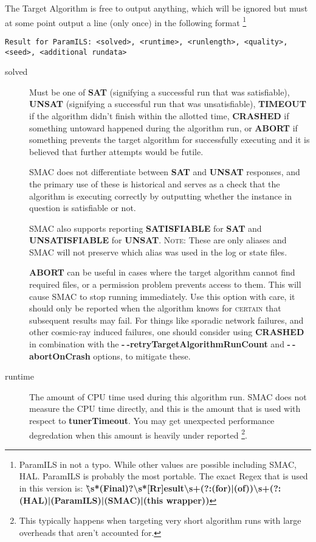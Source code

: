 \documentclass[manual.tex]{subfiles}
\begin{document}
The Target Algorithm is free to output anything, which will be ignored
but must at some point output a line (only once) in the following
format%
\footnote{ParamILS in not a typo. While other values are possible including
SMAC, HAL. ParamILS is probably the most portable. The exact Regex
that is used in this version is: \textbf{\^\textbackslash{}s{*}(Final)?\textbackslash{}s{*}{[}Rr{]}esult\textbackslash{}s+(?:(for)|(of))\textbackslash{}s+(?:(HAL)|(ParamILS)|(SMAC)|(this
wrapper))}} %


\texttt{Result for ParamILS: <solved>, <runtime>, <runlength>, <quality>, <seed>, <additional rundata>}
\begin{description}

\item [{solved}] Must be one of \textbf{SAT} (signifying a successful run that was satisfiable), \textbf{UNSAT} (signifying a successful run that was unsatisfiable), \textbf{TIMEOUT} if the algorithm didn't finish within the allotted time, \textbf{CRASHED} if something untoward happened during the algorithm run, or \textbf{ABORT} if something prevents the target algorithm for successfully executing and it is believed that further attempts would be futile. 

SMAC does not differentiate between \textbf{SAT} and \textbf{UNSAT} responses, and the primary use of these is historical and serves as a check that the algorithm is executing correctly by outputting whether the instance in question is satisfiable or not.

SMAC also supports reporting \textbf{SATISFIABLE} for \textbf{SAT} and \textbf{UNSATISFIABLE} for \textbf{UNSAT}. \textsc{Note:} These are only aliases and SMAC will not preserve which alias was used in the log or state files.


\textbf{ABORT} can be useful in
cases where the target algorithm cannot find required files, or a
permission problem prevents access to them. This will cause SMAC to
stop running immediately. Use this option with care, it should only be reported when the algorithm knows for \textsc{certain} that subsequent results may fail. For things like sporadic network failures, and other cosmic-ray induced failures, one should consider using \textbf{CRASHED} in combination with the \textbf{-$\!~$-retryTargetAlgorithmRunCount}  and \textbf{-$~\!\!$-abortOnCrash} options, to mitigate these.

\item [{runtime}] The amount of CPU time used during this algorithm run.
SMAC does not measure the CPU time directly, and this is the amount
that is used with respect to \textbf{tunerTimeout}. You may get
unexpected performance degredation when this amount is heavily under
reported \footnote{This typically happens when targeting very short algorithm
runs with large overheads that aren't accounted for.}. \\


\end{description}
\end{document}
